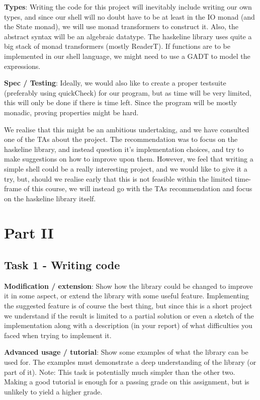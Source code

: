 \documentclass[11pt,a4paper]{article}
\begin{document}
\textbf{Types}: Writing the code for this project will inevitably include writing our own
types, and since our shell will no doubt have to be at least in the IO monad
(and the State monad), we will use monad transformers to construct it. Also, the
abstract syntax will be an algebraic datatype.  The haskeline library uses quite
a big stack of monad transformers (mostly ReaderT). If functions are to be
implemented in our shell language, we might need to use a GADT to model the
expressions.

\textbf{Spec / Testing}: Ideally, we would also like to create  a proper testsuite
(preferably using quickCheck) for our program, but as time will be very limited,
this will only be done if there is time left. Since the program will be mostly
monadic, proving properties might be hard.

We realise that this might be an ambitious undertaking, and we have consulted
one of the TAs about the project. The recommendation was to focus on the
haskeline library, and instead question it’s implementation choices, and try to
make suggestions on how to improve upon them. However, we feel that writing a
simple shell could be a really interesting project, and we would like to give it
a try, but, should we realise early that this is not feasible within the limited
time-frame of this course, we will instead go with the TAs recommendation and
focus on the haskeline library itself.

\section{Part II}

\subsection{Task 1 - Writing code}
\textbf{Modification / extension}: Show how the library could be changed to improve it in
some aspect, or extend the library with some useful feature. Implementing the
suggested feature is of course the best thing, but since this is a short project
we understand if the result is limited to a partial solution or even a sketch of
the implementation along with a description (in your report) of what
difficulties you faced when trying to implement it.

\textbf{Advanced usage / tutorial}: Show some examples of what the library can be used
for. The examples must demonstrate a deep understanding of the library (or part
of it). Note: This task is potentially much simpler than the other two. Making a
good tutorial is enough for a passing grade on this assignment, but is unlikely
to yield a higher grade.
\end{document}
